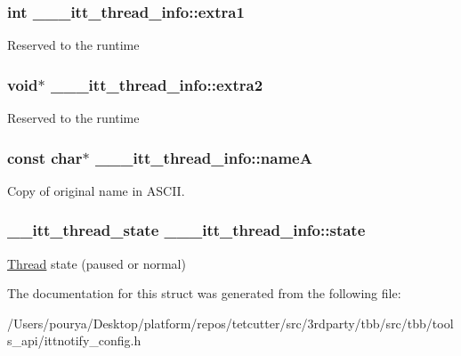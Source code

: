 \subsubsection[{extra1}]{\setlength{\rightskip}{0pt plus 5cm}int \+\_\+\+\_\+\+\_\+itt\+\_\+thread\+\_\+info\+::extra1}\label{struct______itt__thread__info_a24093b12fcbe313abcf61c449d42d66c}
Reserved to the runtime \hypertarget{struct______itt__thread__info_a29a043e53a66cc89b62b11f0ad8e7588}{}
\subsubsection[{extra2}]{\setlength{\rightskip}{0pt plus 5cm}void$\ast$ \+\_\+\+\_\+\+\_\+itt\+\_\+thread\+\_\+info\+::extra2}\label{struct______itt__thread__info_a29a043e53a66cc89b62b11f0ad8e7588}
Reserved to the runtime \hypertarget{struct______itt__thread__info_af0d071b9ab2b86c040a6de800f92cb30}{}
\subsubsection[{name\+A}]{\setlength{\rightskip}{0pt plus 5cm}const char$\ast$ \+\_\+\+\_\+\+\_\+itt\+\_\+thread\+\_\+info\+::name\+A}\label{struct______itt__thread__info_af0d071b9ab2b86c040a6de800f92cb30}
Copy of original name in A\+S\+C\+I\+I. \hypertarget{struct______itt__thread__info_a6f6f3ed5a462461cc8dc05b650e331ba}{}
\subsubsection[{state}]{\setlength{\rightskip}{0pt plus 5cm}\+\_\+\+\_\+itt\+\_\+thread\+\_\+state \+\_\+\+\_\+\+\_\+itt\+\_\+thread\+\_\+info\+::state}\label{struct______itt__thread__info_a6f6f3ed5a462461cc8dc05b650e331ba}
\hyperlink{structThread}{Thread} state (paused or normal) 

The documentation for this struct was generated from the following file\+:\begin{DoxyCompactItemize}
\item 
/\+Users/pourya/\+Desktop/platform/repos/tetcutter/src/3rdparty/tbb/src/tbb/tools\+\_\+api/ittnotify\+\_\+config.\+h\end{DoxyCompactItemize}
